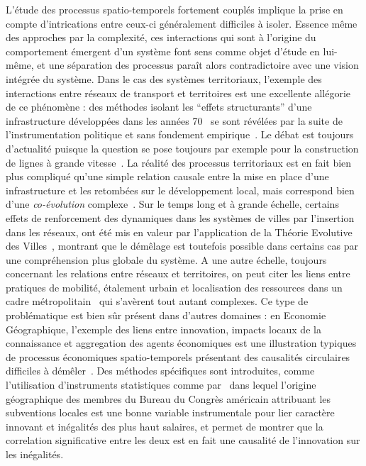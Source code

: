 {
L'étude des processus spatio-temporels fortement couplés implique la prise en compte d'intrications entre ceux-ci généralement difficiles à isoler. Essence même des approches par la complexité, ces interactions qui sont à l'origine du comportement émergent d'un système font sens comme objet d'étude en lui-même, et une séparation des processus paraît alors contradictoire avec une vision intégrée du système. Dans le cas des systèmes territoriaux, l'exemple des interactions entre réseaux de transport et territoires est une excellente allégorie de ce phénomène : des méthodes isolant les ``effets structurants'' d'une infrastructure développées dans les années 70~\cite{bonnafous1974methodologies} se sont révélées par la suite de l'instrumentation politique et sans fondement empirique~\cite{offner1993effets}. Le débat est toujours d'actualité puisque la question se pose toujours par exemple pour la construction de lignes à grande vitesse~\cite{crozethalshs01094554}. La réalité des processus territoriaux est en fait bien plus compliqué qu'une simple relation causale entre la mise en place d'une infrastructure et les retombées sur le développement local, mais correspond bien d'une \emph{co-évolution} complexe~\cite{bretagnolletel00459720}. Sur le temps long et à grande échelle, certains effets de renforcement des dynamiques dans les systèmes de villes par l'insertion dans les réseaux, ont été mis en valeur par l'application de la Théorie Evolutive des Villes~\cite{espacegeo2014effets}, montrant que le démêlage est toutefois possible dans certains cas par une compréhension plus globale du système. A une autre échelle, toujours concernant les relations entre réseaux et territoires, on peut citer les liens entre pratiques de mobilité, étalement urbain et localisation des ressources dans un cadre métropolitain~\cite{cerqueira2017inegalites} qui s'avèrent tout autant complexes. Ce type de problématique est bien sûr présent dans d'autres domaines : en Economie Géographique, l'exemple des liens entre innovation, impacts locaux de la connaissance et aggregation des agents économiques est une illustration typiques de processus économiques spatio-temporels présentant des causalités circulaires difficiles à démêler~\cite{audretsch1996r}. Des méthodes spécifiques sont introduites, comme l'utilisation d'instruments statistiques comme par~\cite{aghion2015innovation} dans lequel l'origine géographique des membres du Bureau du Congrès américain attribuant les subventions locales est une bonne variable instrumentale pour lier caractère innovant et inégalités des plus haut salaires, et permet de montrer que la correlation significative entre les deux est en fait une causalité de l'innovation sur les inégalités.
}


